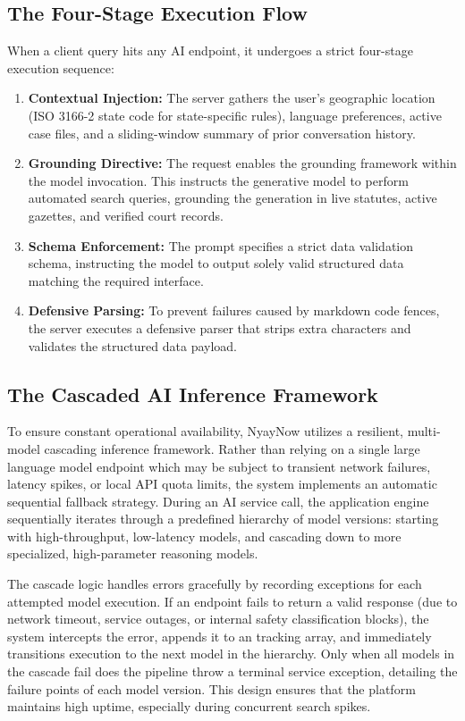 \documentclass[conference]{IEEEtran}
\begin{document}
\subsection{The Four-Stage Execution Flow}
When a client query hits any AI endpoint, it undergoes a strict four-stage execution sequence:
\begin{enumerate}[leftmargin=*]
  \item \textbf{Contextual Injection:} The server gathers the user's geographic location (ISO 3166-2 state code for state-specific rules), language preferences, active case files, and a sliding-window summary of prior conversation history.
  \item \textbf{Grounding Directive:} The request enables the grounding framework within the model invocation. This instructs the generative model to perform automated search queries, grounding the generation in live statutes, active gazettes, and verified court records.
  \item \textbf{Schema Enforcement:} The prompt specifies a strict data validation schema, instructing the model to output solely valid structured data matching the required interface.
  \item \textbf{Defensive Parsing:} To prevent failures caused by markdown code fences, the server executes a defensive parser that strips extra characters and validates the structured data payload.
\end{enumerate}

\subsection{The Cascaded AI Inference Framework}
To ensure constant operational availability, NyayNow utilizes a resilient, multi-model cascading inference framework. Rather than relying on a single large language model endpoint which may be subject to transient network failures, latency spikes, or local API quota limits, the system implements an automatic sequential fallback strategy. During an AI service call, the application engine sequentially iterates through a predefined hierarchy of model versions: starting with high-throughput, low-latency models, and cascading down to more specialized, high-parameter reasoning models.

The cascade logic handles errors gracefully by recording exceptions for each attempted model execution. If an endpoint fails to return a valid response (due to network timeout, service outages, or internal safety classification blocks), the system intercepts the error, appends it to an tracking array, and immediately transitions execution to the next model in the hierarchy. Only when all models in the cascade fail does the pipeline throw a terminal service exception, detailing the failure points of each model version. This design ensures that the platform maintains high uptime, especially during concurrent search spikes.
\end{document}
